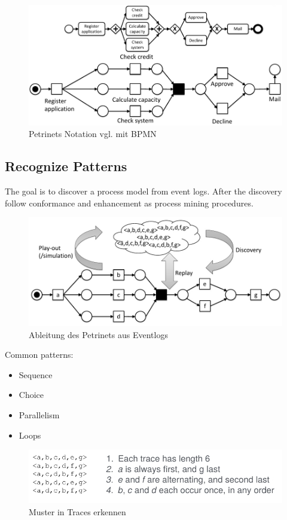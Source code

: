 \begin{figure}[H]
\includegraphics[width=14cm]{Chapters/Notizen_Graphics/Petri_BPMN_Notation.jpg}
\caption{Petrinets Notation vgl. mit BPMN} 
\end{figure}


\subsection{Recognize Patterns}
The goal is to discover a process model from event logs.
After the discovery follow conformance and enhancement as process mining procedures.

\begin{figure}[H]
\includegraphics[width=14cm]{Chapters/Notizen_Graphics/ProcessModel_Behaviour.jpg}
\caption{Ableitung des Petrinets aus Eventlogs} 
\end{figure}

Common patterns:
\begin{itemize}
\setlength{\itemsep}{0.4mm}
\item{Sequence}
\item{Choice}
\item{Parallelism}
\item{Loops}
\end{itemize}

\begin{figure}[H]
\includegraphics[width=14cm]{Chapters/Notizen_Graphics/Recognize_Patterns.jpg}
\caption{Muster in Traces erkennen} 
\end{figure}

